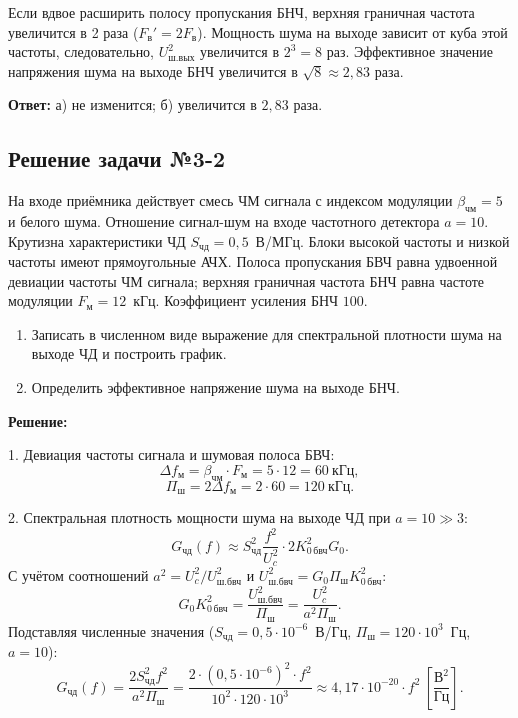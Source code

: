     Если вдвое расширить полосу пропускания БНЧ, верхняя граничная частота увеличится в 2 раза ($F_{\text{в}}' = 2 F_{\text{в}}$). Мощность шума на выходе зависит от куба этой частоты, следовательно, $U_{\text{ш.вых}}^2$ увеличится в $2^3 = 8$ раз. Эффективное значение напряжения шума на выходе БНЧ увеличится в $\sqrt{8} \approx 2{,}83$ раза.

\noindent\textbf{Ответ:} а) не изменится; б) увеличится в $2{,}83$ раза.

\subsection{Решение задачи №3-2}

На входе приёмника действует смесь ЧМ сигнала с индексом модуляции $\beta_{\text{чм}} = 5$ и белого шума. Отношение сигнал-шум на входе частотного детектора $a = 10$. Крутизна характеристики ЧД $S_{\text{чд}} = 0{,}5$~В/МГц. Блоки высокой частоты и низкой частоты имеют прямоугольные АЧХ. Полоса пропускания БВЧ равна удвоенной девиации частоты ЧМ сигнала; верхняя граничная частота БНЧ равна частоте модуляции $F_{\text{м}} = 12$~кГц. Коэффициент усиления БНЧ $100$.
\begin{enumerate}
    \item Записать в численном виде выражение для спектральной плотности шума на выходе ЧД и построить график.
    \item Определить эффективное напряжение шума на выходе БНЧ.
\end{enumerate}

\medskip
\noindent\textbf{Решение:}

1. Девиация частоты сигнала и шумовая полоса БВЧ:
\begin{equation}
    \Delta f_{\text{м}} = \beta_{\text{чм}} \cdot F_{\text{м}} = 5 \cdot 12 = 60~\text{кГц},
\end{equation}
\begin{equation}
    \Pi_{\text{ш}} = 2\Delta f_{\text{м}} = 2 \cdot 60 = 120~\text{кГц}.
\end{equation}

2. Спектральная плотность мощности шума на выходе ЧД при $a = 10 \gg 3$:
\begin{equation}
    G_{\text{чд}}(f) \approx S_{\text{чд}}^2 \frac{f^2}{U_c^2} \cdot 2 K_{0\,\text{бвч}}^2 G_0.
\end{equation}
С учётом соотношений $a^2 = U_c^2 / U_{\text{ш.бвч}}^2$ и $U_{\text{ш.бвч}}^2 = G_0 \Pi_{\text{ш}} K_{0\,\text{бвч}}^2$:
\begin{equation}
    G_0 K_{0\,\text{бвч}}^2 = \frac{U_{\text{ш.бвч}}^2}{\Pi_{\text{ш}}} = \frac{U_c^2}{a^2 \Pi_{\text{ш}}}.
\end{equation}
Подставляя численные значения ($S_{\text{чд}} = 0{,}5 \cdot 10^{-6}$~В/Гц, $\Pi_{\text{ш}} = 120 \cdot 10^3$~Гц, $a = 10$):
\begin{equation}
    G_{\text{чд}}(f) = \frac{2 S_{\text{чд}}^2 f^2}{a^2 \Pi_{\text{ш}}} = \frac{2 \cdot (0{,}5 \cdot 10^{-6})^2 \cdot f^2}{10^2 \cdot 120 \cdot 10^3} \approx 4{,}17 \cdot 10^{-20} \cdot f^2~\left[\frac{\text{В}^2}{\text{Гц}}\right].
\end{equation}

